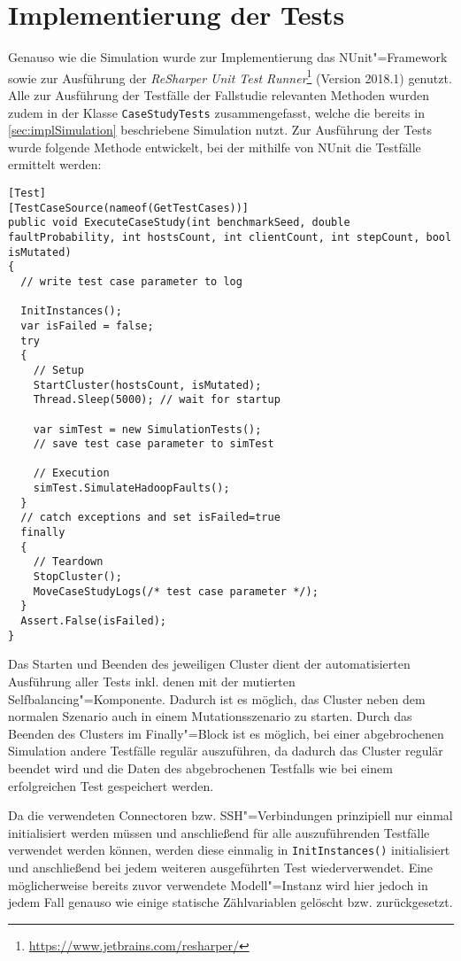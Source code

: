 \section{Implementierung der Tests}
\label{sec:implTestcases}

Genauso wie die Simulation wurde zur Implementierung das NUnit"=Framework sowie zur Ausführung der \emph{ReSharper Unit Test Runner}\footnote{\url{https://www.jetbrains.com/resharper/}} (Version 2018.1) genutzt.
Alle zur Ausführung der Testfälle der Fallstudie relevanten Methoden wurden zudem in der Klasse \texttt{CaseStudyTests} zusammengefasst, welche die bereits in \cref{sec:implSimulation} beschriebene Simulation nutzt.
Zur Ausführung der Tests wurde folgende Methode entwickelt, bei der mithilfe von NUnit die Testfälle ermittelt werden:

\begin{lstlisting}[label=lst:executeTestCases,style=cs,
caption={[Methode zur Ausführung der Testfälle]
    Methode zur Ausführung der Testfälle (gekürzt)}]
[Test]
[TestCaseSource(nameof(GetTestCases))]
public void ExecuteCaseStudy(int benchmarkSeed, double faultProbability, int hostsCount, int clientCount, int stepCount, bool isMutated)
{
  // write test case parameter to log
  
  InitInstances();
  var isFailed = false;
  try
  {
    // Setup
    StartCluster(hostsCount, isMutated);
    Thread.Sleep(5000); // wait for startup
    
    var simTest = new SimulationTests();
    // save test case parameter to simTest
    
    // Execution
    simTest.SimulateHadoopFaults();
  }
  // catch exceptions and set isFailed=true
  finally
  {
    // Teardown
    StopCluster();
    MoveCaseStudyLogs(/* test case parameter */);
  }
  Assert.False(isFailed);
}
\end{lstlisting}

Das Starten und Beenden des jeweiligen Cluster dient der automatisierten Ausführung aller Tests inkl. denen mit der mutierten Selfbalancing"=Komponente.
Dadurch ist es möglich, das Cluster neben dem normalen Szenario auch in einem Mutationsszenario zu starten.
Durch das Beenden des Clusters im Finally"=Block ist es möglich, bei einer abgebrochenen Simulation andere Testfälle regulär auszuführen, da dadurch das Cluster regulär beendet wird und die Daten des abgebrochenen Testfalls wie bei einem erfolgreichen Test gespeichert werden.

Da die verwendeten Connectoren bzw. SSH"=Verbindungen prinzipiell nur einmal initialisiert werden müssen und anschließend für alle auszuführenden Testfälle verwendet werden können, werden diese einmalig in \texttt{InitInstances()} initialisiert und anschließend bei jedem weiteren ausgeführten Test wiederverwendet.
Eine möglicherweise bereits zuvor verwendete Modell"=Instanz wird hier jedoch in jedem Fall genauso wie einige statische Zählvariablen gelöscht bzw. zurückgesetzt.

